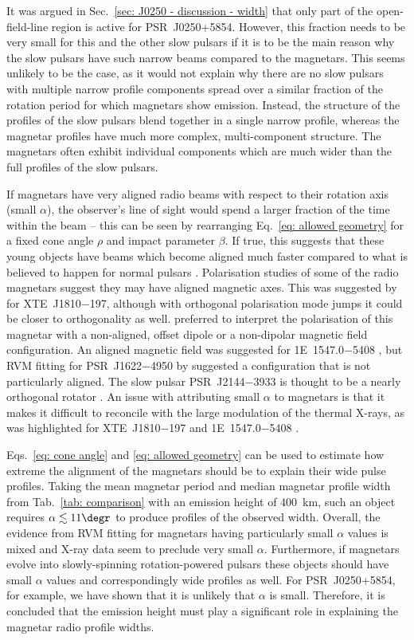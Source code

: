 It was argued in Sec.~\ref{sec: J0250 - discussion - width} that only part of the open-field-line region is active for PSR~J0250+5854. However, this fraction needs to be very small for this and the other slow pulsars if it is to be the main reason why the slow pulsars have such narrow beams compared to the magnetars. This seems unlikely to be the case, as it would not explain why there are no slow pulsars with multiple narrow profile components spread over a similar fraction of the rotation period for which magnetars show emission. Instead, the structure of the profiles of the slow pulsars blend together in a single narrow profile, whereas the magnetar profiles have much more complex, multi-component structure. The magnetars often exhibit individual components which are much wider than the full profiles of the slow pulsars.

If magnetars have very aligned radio beams with respect to their rotation axis (small $\alpha$), the observer's line of sight would spend a larger fraction of the time within the beam -- this can be seen by rearranging Eq.~\eqref{eq: allowed geometry} for a fixed cone angle $\rho$ and impact parameter $\beta$. If true, this suggests that these young objects have beams which become aligned much faster compared to what is believed to happen for normal pulsars \citep{TMxx1998,WJxx2008}. Polarisation studies of some of the radio magnetars suggest they may have aligned magnetic axes. This was suggested by \citet{CCR+2007} for XTE~J1810$-$197, although with orthogonal polarisation mode jumps it could be closer to orthogonality as well. \citet{KSJ+2007} preferred to interpret the polarisation of this magnetar with a non-aligned, offset dipole or a non-dipolar magnetic field configuration. An aligned magnetic field was suggested for 1E~1547.0$-$5408 \citep{CRJ+2008}, but RVM fitting for PSR~J1622$-$4950 by \citet{LBB+2012} suggested a configuration that is not particularly aligned. The slow pulsar PSR~J2144$-$3933 is thought to be a nearly orthogonal rotator \citep{MBM+2020}. An issue with attributing small $\alpha$ to magnetars is that it makes it difficult to reconcile with the large modulation of the thermal X-rays, as was highlighted for XTE~J1810$-$197 \citep{GHxx2007,PGxx2008} and 1E~1547.0$-$5408 \citep{IER+2010}.

Eqs.~\eqref{eq: cone angle} and \eqref{eq: allowed geometry} can be used to estimate how extreme the alignment of the magnetars should be to explain their wide pulse profiles. Taking the mean magnetar period and median magnetar profile width from Tab.~\ref{tab: comparison} with an emission height of 400~km, such an object requires $\alpha\lesssim 11\degr$ to produce profiles of the observed width. Overall, the evidence from RVM fitting for magnetars having particularly small $\alpha$ values is mixed and X-ray data seem to preclude very small $\alpha$. Furthermore, if magnetars evolve into slowly-spinning rotation-powered pulsars these objects should have small $\alpha$ values and correspondingly wide profiles as well. For PSR~J0250+5854, for example, we have shown that it is unlikely that $\alpha$ is small. Therefore, it is concluded that the emission height must play a significant role in explaining the magnetar radio profile widths.

